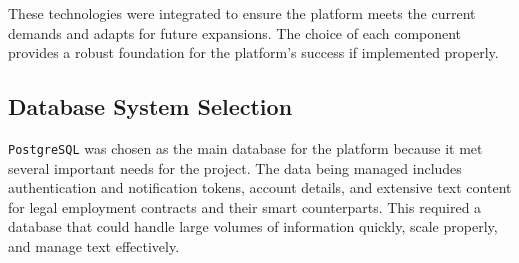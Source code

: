 These technologies were integrated to ensure the platform meets the current demands and adapts for future expansions. The choice of each component provides a robust foundation for the platform’s success if implemented properly.

\subsection{Database System Selection}

\texttt{PostgreSQL} was chosen as the main database for the platform because it met several important needs for the project. The data being managed includes authentication and notification tokens, account details, and extensive text content for legal employment contracts and their smart counterparts. This required a database that could handle large volumes of information quickly, scale properly, and manage text effectively.

